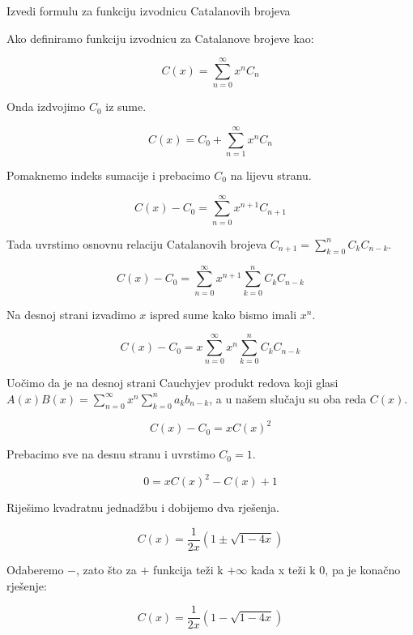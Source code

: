 \documentclass[exam.tex]{subfiles}
\begin{document}
	\begin{subtask}
		Izvedi formulu za funkciju izvodnicu Catalanovih brojeva \\
	\end{subtask}
	
	Ako definiramo funkciju izvodnicu za Catalanove brojeve kao:
	
	\[ C(x) = \sum\limits^\infty_{n=0} x^n C_n \]
	
	Onda izdvojimo \( C_0 \) iz sume.
	
	\[ C(x) = C_0 + 	\sum\limits^\infty_{n=1} x^n C_n \]
	
	Pomaknemo indeks sumacije i prebacimo \( C_0 \) na lijevu stranu.
	
	\[ C(x) - C_0 = 	\sum\limits^\infty_{n=0} x^{n + 1} C_{n + 1} \]
	
	Tada uvrstimo osnovnu relaciju Catalanovih brojeva \( C_{n + 1} = \sum\limits^n_{k=0} C_k C_{n - k} \).
	
	\[ C(x) - C_0 = 	\sum\limits^\infty_{n=0} x^{n + 1} \sum\limits^n_{k=0} C_k C_{n - k} \]
	
	Na desnoj strani izvadimo \( x \) ispred sume kako bismo imali \( x^n \).
	
	\[ C(x) - C_0 = 	x \sum\limits^\infty_{n=0} x^n \sum\limits^n_{k=0} C_k C_{n - k} \]
	
	Uočimo da je na desnoj strani Cauchyjev produkt redova koji glasi \( A(x) B(x) = \sum\limits^\infty_{n=0} x^n \sum\limits^n_{k=0} a_k b_{n - k} \), a u našem slučaju su oba reda \( C(x) \).
	
	\[ C(x) - C_0 = 	x C(x)^2 \]
	
	Prebacimo sve na desnu stranu i uvrstimo \( C_0 = 1 \).
	
	\[ 0 = 	x C(x)^2 - C(x) + 1 \]
	
	Riješimo kvadratnu jednadžbu i dobijemo dva rješenja.
	
	\[ C(x) = \frac{1}{2x} \left ( 1 \pm \sqrt{1 - 4x} \right ) \]
	
	Odaberemo \( - \), zato što za \( + \) funkcija teži k \( + \infty \) kada x teži k \( 0 \), pa je konačno rješenje:
	
	\[ C(x) = \frac{1}{2x} \left ( 1 - \sqrt{1 - 4x} \right ) \]
\end{document}
